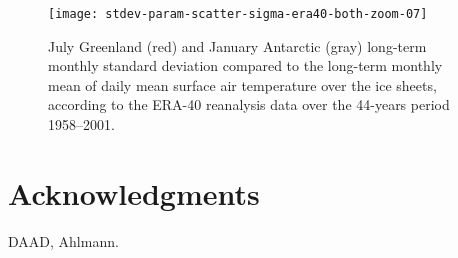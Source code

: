 \documentclass[review]{igs}
\begin{document}
\begin{figure}
    \centering\texttt{[image: stdev-param-scatter-sigma-era40-both-zoom-07]}
    \caption{July Greenland (red) and January Antarctic (gray) long-term monthly standard deviation compared to the long-term monthly mean of daily mean surface air temperature over the ice sheets, according to the ERA-40 reanalysis data \citep{uppala-etal-2005} over the 44-years period 1958–2001.}
    \label{fig:both}
\end{figure}


\section{Acknowledgments}

DAAD, Ahlmann.



\end{document}
